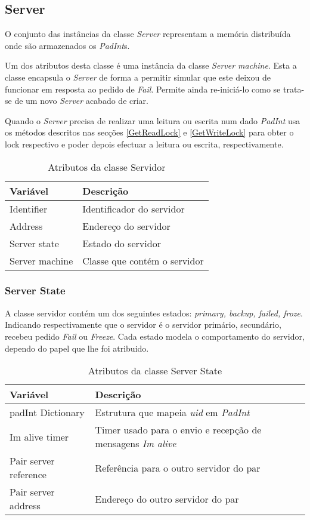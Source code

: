\subsection{Server}
\label{Server}
O conjunto das instâncias da classe \textit{Server} representam a memória distribuída onde são armazenados os \textit{PadInt}s.

Um dos atributos desta classe é uma instância da classe \textit{Server machine}. Esta a classe encapsula o \textit{Server} de forma a permitir simular que este deixou de funcionar em resposta ao pedido de \textit{Fail}. Permite ainda re-iniciá-lo como se trata-se de um novo \textit{Server} acabado de criar.

Quando o \textit{Server} precisa de realizar uma leitura ou escrita num dado \textit{PadInt} usa os métodos descritos nas secções \ref{GetReadLock} e \ref{GetWriteLock} para obter o lock respectivo e poder depois efectuar a leitura ou escrita, respectivamente.

\begin{table}[H]
\centering
\begin{tabular}{| p{2cm} | p{} |}
\hline
\textbf{Variável} & \textbf{Descrição} \\
\hline
Identifier & Identificador do servidor \\
\hline
Address & Endereço do servidor \\
\hline
Server state & Estado do servidor\\
\hline
Server machine & Classe que contém o servidor\\
\hline
\end{tabular}
\caption{Atributos da classe Servidor}
\end{table}

\subsubsection{Server State}
\label{Server State}
A classe servidor contém um dos seguintes estados: \textit{primary, backup, failed, froze}. Indicando respectivamente que o servidor é o servidor primário, secundário, recebeu pedido  \textit{Fail} ou \textit{Freeze}. Cada estado modela o comportamento do servidor, dependo do papel que lhe foi atribuido.

\begin{table}[H]
\centering
\begin{tabular}{| p{2cm} | p{} |}
\hline
\textbf{Variável} & \textbf{Descrição} \\
\hline
padInt Dictionary & Estrutura que mapeia \textit{uid} em \textit{PadInt} \\
\hline
Im alive timer & Timer usado para o envio e recepção de mensagens \textit{Im alive}\\
\hline
Pair server reference & Referência para o outro servidor do par\\
\hline
Pair server address & Endereço do outro servidor do par\\
\hline
\end{tabular}
\caption{Atributos da classe Server State}
\end{table}